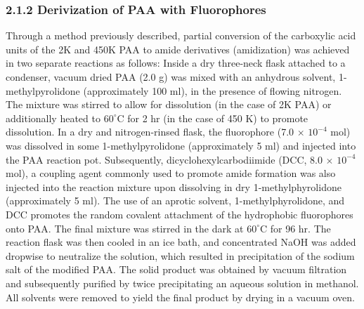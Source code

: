 \documentclass[journal=mamobx,manuscript=article]{achemso}
\begin{document}
\subsubsection{2.1.2 Derivization of PAA with Fluorophores}  %
    \label{sec-derivPAA}

Through a method previously described, \cite{weber1954fluorescent,Anghel1998} partial conversion of the carboxylic acid units of the 2K and 450K PAA to amide derivatives (amidization) was achieved in two separate reactions as follows:  Inside a dry three-neck flask attached to a condenser, vacuum dried PAA (2.0 g) was mixed with an anhydrous solvent, 1-methylpyrolidone (approximately 100 ml), in the presence of flowing nitrogen.  The mixture was stirred to allow for dissolution (in the case of 2K PAA) or additionally heated to $60^{\circ}$C for 2 hr (in the case of 450 K) to promote dissolution.  In a dry and nitrogen-rinsed flask, the fluorophore (7.0 $\times$ $10^{-4}$ mol) was dissolved in some 1-methylpyrolidone (approximately 5 ml) and injected into the PAA reaction pot.  Subsequently, dicyclohexylcarbodiimide (DCC, 8.0 $\times$ $10^{-4}$ mol), a coupling agent commonly used to promote amide formation was also injected into the reaction mixture upon dissolving in dry 1-methylphyrolidone (approximately 5 ml).  The use of an aprotic solvent, 1-methylphyrolidone, and DCC promotes the random covalent attachment of the hydrophobic fluorophores onto PAA.\cite{Anghel1998}  The final mixture was stirred in the dark at $60^{\circ}$C for 96 hr.  The reaction flask was then cooled in an ice bath, and concentrated NaOH was added dropwise to neutralize the solution, which resulted in precipitation of the sodium salt of the modified PAA.  The solid product was obtained by vacuum filtration and subsequently purified by twice precipitating an aqueous solution in methanol.  All solvents were removed to yield the final product by drying in a vacuum oven.
\end{document}
